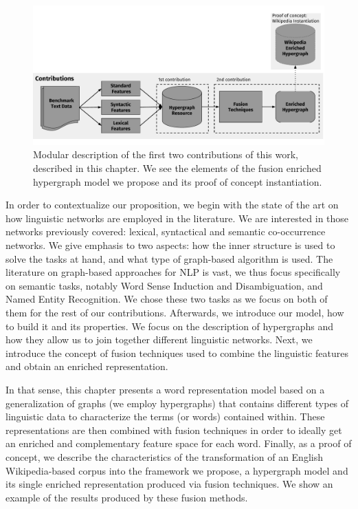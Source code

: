 \begin{figure}
\centering
\includegraphics[width=1\linewidth]{./images/Chapitre3/main_diag_p1.pdf}
\caption{Modular description of the first two contributions of this work, described in this chapter. We see the elements of the fusion enriched hypergraph model we propose and its proof of concept instantiation.} 
\label{fig:maindiag}
\end{figure}

In order to contextualize our proposition, we begin with the state of the art on how linguistic networks are employed in the literature. We are interested in those networks previously covered: lexical, syntactical and semantic co-occurrence networks. We give emphasis to two aspects: how the inner structure is used to solve the tasks at hand, and what type of graph-based algorithm is used. The literature on graph-based approaches for NLP is vast, we thus focus specifically on semantic tasks, notably Word Sense Induction and Disambiguation, and Named Entity Recognition. We chose these two tasks as we focus on both of them for the rest of our contributions. Afterwards, we introduce our model, how to build it  and its properties. We focus on the description of hypergraphs and how they allow us to join together different linguistic networks. Next, we introduce the concept of fusion techniques used to combine the linguistic features and obtain an enriched representation.

In that sense, this chapter presents a word representation model based on a generalization of graphs (we employ hypergraphs) that contains different types of linguistic data to characterize the terms (or words) contained within.  These representations are then combined with fusion techniques in order to ideally get an enriched and complementary feature space for each word. Finally, as a proof of concept, we describe the characteristics of the transformation of an English Wikipedia-based corpus into the framework we propose, a hypergraph model and its single enriched representation produced via fusion techniques. We show an example of the results produced by these fusion methods.

